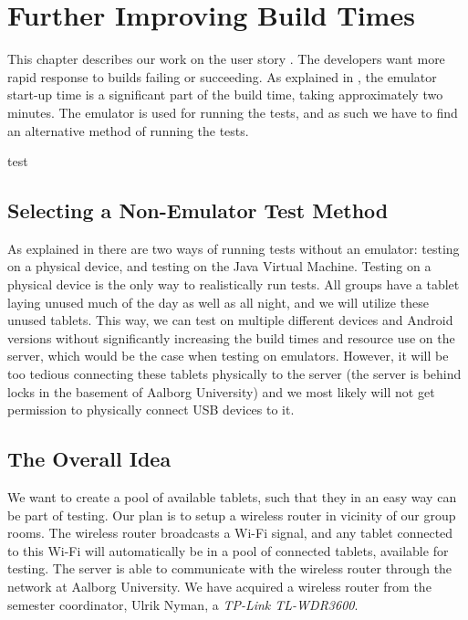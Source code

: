 \chapter{Further Improving Build Times}
This chapter describes our work on the user story . The developers want more rapid response to builds failing or succeeding. As explained in , the emulator start-up time is a significant part of the build time, taking approximately two minutes. The emulator is used for running the tests, and as such we have to find an alternative method of running the tests.

\begin{chapterorganization}
  \item test
\end{chapterorganization}

\section{Selecting a Non-Emulator Test Method}
As explained in  there are two ways of running tests without an emulator: testing on a physical device, and testing on the Java Virtual Machine. Testing on a physical device is the only way to realistically run tests. All groups have a tablet laying unused much of the day as well as all night, and we will utilize these unused tablets. This way, we can test on multiple different devices and Android versions without significantly increasing the build times and resource use on the server, which would be the case when testing on emulators. However, it will be too tedious connecting these tablets physically to the server (the server is behind locks in the basement of Aalborg University) and we most likely will not get permission to physically connect USB devices to it.

\section{The Overall Idea}
We want to create a pool of available tablets, such that they in an easy way can be part of testing. Our plan is to setup a wireless router in vicinity of our group rooms. The wireless router broadcasts a Wi-Fi signal, and any tablet connected to this Wi-Fi will automatically be in a pool of connected tablets, available for testing. The server is able to communicate with the wireless router through the network at Aalborg University. We have acquired a wireless router from the semester coordinator, Ulrik Nyman, a \emph{TP-Link TL-WDR3600}.

